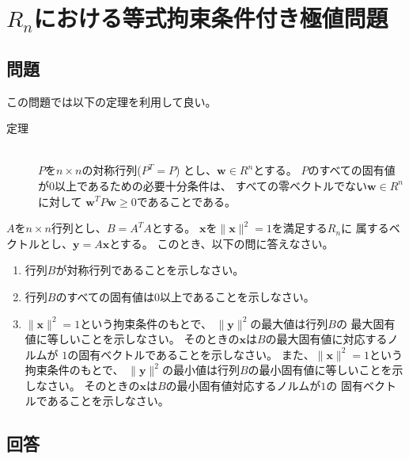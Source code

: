 \newpage

\section{\(R_{n}\)における等式拘束条件付き極値問題} \label{section:3}

\subsection{問題}

この問題では以下の定理を利用して良い。

\begin{description}
  \item[定理]~\\ \(P\)を\(n \times n\)の対称行列(\(P^{T} = P\)) とし、\(\bm{w} \in R^{n}\)とする。
  \(P\)のすべての固有値が\(0\)以上であるための必要十分条件は、
  すべての零ベクトルでない\(\bm{w} \in R^{n}\)に対して
  \(\bm{w}^{T} P \bm{w} \geq 0\)であることである。
\end{description}

\(A\)を\(n \times n\)行列とし、\(B = A^{T} A\)とする。
\(\bm{x}\)を\(\|\bm{x}\|^{2} = 1\)を満足する\(R_{n}\)に
属するベクトルとし、\(\bm{y} = A \bm{x}\)とする。
このとき、以下の問に答えなさい。

\begin{enumerate}
  \item 行列\(B\)が対称行列であることを示しなさい。
  \item 行列\(B\)のすべての固有値は\(0\)以上であることを示しなさい。
  \item \(\|\bm{x}\|^{2} = 1\)という拘束条件のもとで、
  \(\|\bm{y}\|^{2}\)の最大値は行列\(B\)の
  最大固有値に等しいことを示しなさい。
  そのときの\(\bm{x}\)は\(B\)の最大固有値に対応するノルムが
  \(1\)の固有ベクトルであることを示しなさい。
  また、\(\|\bm{x}\|^{2} = 1\)という拘束条件のもとで、
  \(\|\bm{y}\|^{2}\)の最小値は行列\(B\)の最小固有値に等しいことを示しなさい。
  そのときの\(\bm{x}\)は\(B\)の最小固有値対応するノルムが\(1\)の
  固有ベクトルであることを示しなさい。
\end{enumerate}

\subsection{回答}

